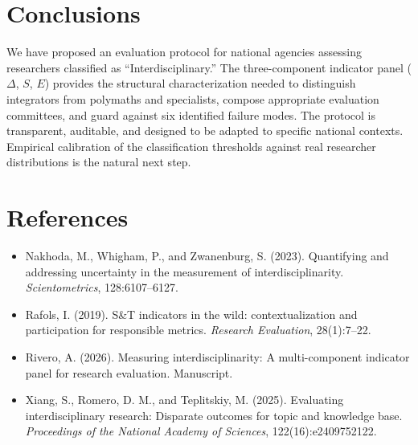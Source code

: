\documentclass[
]{article}
\providecommand{\tightlist}{%
  \setlength{\itemsep}{0pt}\setlength{\parskip}{0pt}}
\begin{document}
\hypertarget{conclusions}{%
\section{Conclusions}\label{conclusions}}

We have proposed an evaluation protocol for national agencies assessing
researchers classified as ``Interdisciplinary.'' The three-component
indicator panel (\(\Delta\), \(S\), \(E\)) provides the structural
characterization needed to distinguish integrators from polymaths and
specialists, compose appropriate evaluation committees, and guard
against six identified failure modes. The protocol is transparent,
auditable, and designed to be adapted to specific national contexts.
Empirical calibration of the classification thresholds against real
researcher distributions is the natural next step.

\hypertarget{references}{%
\section{References}\label{references}}

\begin{itemize}
\tightlist
\item
  Nakhoda, M., Whigham, P., and Zwanenburg, S. (2023). Quantifying and
  addressing uncertainty in the measurement of interdisciplinarity.
  \emph{Scientometrics}, 128:6107--6127.
\item
  Rafols, I. (2019). S\&T indicators in the wild: contextualization and
  participation for responsible metrics. \emph{Research Evaluation},
  28(1):7--22.
\item
  Rivero, A. (2026). Measuring interdisciplinarity: A multi-component
  indicator panel for research evaluation. Manuscript.
\item
  Xiang, S., Romero, D. M., and Teplitskiy, M. (2025). Evaluating
  interdisciplinary research: Disparate outcomes for topic and knowledge
  base. \emph{Proceedings of the National Academy of Sciences},
  122(16):e2409752122.
\end{itemize}
\end{document}
